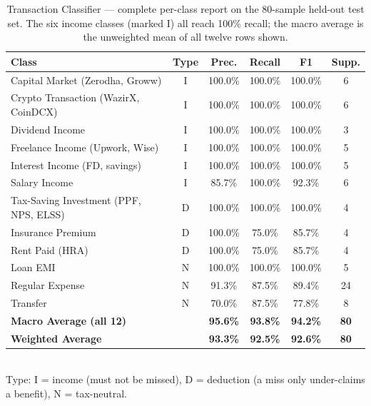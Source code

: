 \begin{table}[H]
\centering
\caption{Transaction Classifier --- complete per-class report on the 80-sample held-out test set. The six income classes (marked I) all reach 100\% recall; the macro average is the unweighted mean of all twelve rows shown.}
\label{tab:classifier}
\small
\begin{tabularx}{\textwidth}{|X|c|c|c|c|c|}
\hline
\textbf{Class} & \textbf{Type} & \textbf{Prec.} & \textbf{Recall} & \textbf{F1} & \textbf{Supp.} \\
\hline
Capital Market (Zerodha, Groww)        & I & 100.0\% & 100.0\% & 100.0\% & 6 \\
\hline
Crypto Transaction (WazirX, CoinDCX)   & I & 100.0\% & 100.0\% & 100.0\% & 6 \\
\hline
Dividend Income                        & I & 100.0\% & 100.0\% & 100.0\% & 3 \\
\hline
Freelance Income (Upwork, Wise)        & I & 100.0\% & 100.0\% & 100.0\% & 5 \\
\hline
Interest Income (FD, savings)          & I & 100.0\% & 100.0\% & 100.0\% & 5 \\
\hline
Salary Income                          & I & 85.7\%  & 100.0\% & 92.3\%  & 6 \\
\hline
Tax-Saving Investment (PPF, NPS, ELSS) & D & 100.0\% & 100.0\% & 100.0\% & 4 \\
\hline
Insurance Premium                      & D & 100.0\% & 75.0\%  & 85.7\%  & 4 \\
\hline
Rent Paid (HRA)                        & D & 100.0\% & 75.0\%  & 85.7\%  & 4 \\
\hline
Loan EMI                               & N & 100.0\% & 100.0\% & 100.0\% & 5 \\
\hline
Regular Expense                        & N & 91.3\%  & 87.5\%  & 89.4\%  & 24 \\
\hline
Transfer                               & N & 70.0\%  & 87.5\%  & 77.8\%  & 8 \\
\hline
\textbf{Macro Average (all 12)}        &   & \textbf{95.6\%} & \textbf{93.8\%} & \textbf{94.2\%} & \textbf{80} \\
\hline
\textbf{Weighted Average}              &   & \textbf{93.3\%} & \textbf{92.5\%} & \textbf{92.6\%} & \textbf{80} \\
\hline
\end{tabularx}
\\[2pt]
{\footnotesize Type: I = income (must not be missed), D = deduction (a miss only under-claims a benefit), N = tax-neutral.}
\end{table}

